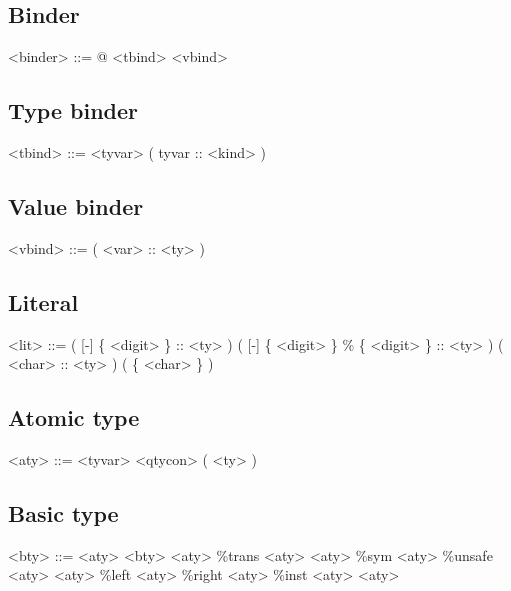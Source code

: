 \subsection{Binder}

\begin{grammar}
<binder> ::= @ <tbind>
        \alt <vbind>
\end{grammar}

\subsection{Type binder}

\begin{grammar}
<tbind> ::= <tyvar>
       \alt ( tyvar :: <kind> )
\end{grammar}

\subsection{Value binder}

\begin{grammar}
<vbind> ::= ( <var> :: <ty> )
\end{grammar}

\subsection{Literal}

\begin{grammar}
<lit> ::= ( [-] \{ <digit> \} :: <ty> )
     \alt ( [-] \{ <digit> \} \% \{ <digit> \} :: <ty> )
     \alt ( <char> :: <ty> )
     \alt ( \{ <char> \} )
\end{grammar}

\subsection{Atomic type}

\begin{grammar}
<aty> ::= <tyvar>
     \alt <qtycon>
     \alt ( <ty> )
\end{grammar}

\subsection{Basic type}

\begin{grammar}
<bty> ::= <aty>
     \alt <bty> <aty>
     \alt \%trans <aty> <aty>
     \alt \%sym <aty>
     \alt \%unsafe <aty> <aty>
     \alt \%left <aty>
     \alt \%right <aty>
     \alt \%inst <aty> <aty>
\end{grammar}

